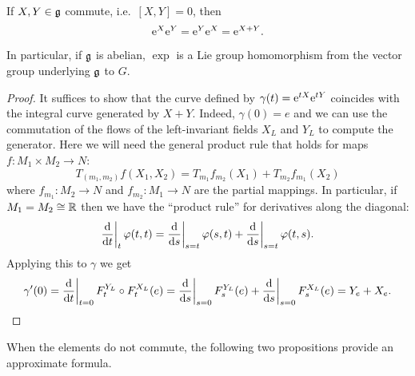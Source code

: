 \begin{prop}
    If $X,Y\in\mathfrak{g}$ commute, i.e.~$[X,Y]=0$, then
    \[\mathrm{e}^X\mathrm{e}^Y=\mathrm{e}^Y\mathrm{e}^X=\mathrm{e}^{X+Y}.\]
    In particular, if $\mathfrak{g}$ is abelian, $\exp$ is a Lie group homomorphism from the vector group underlying $\mathfrak{g}$ to $G$.
\end{prop}
\begin{proof}
    It suffices to show that the curve defined by $\gamma(t)=\mathrm{e}^{tX}\mathrm{e}^{tY}$ coincides with the integral curve generated by $X+Y$. Indeed, $\gamma(0)=e$ and we can use the commutation of the flows of the left-invariant fields $X_L$ and $Y_L$ to compute the generator. Here we will need the general product rule that holds for maps $f:M_1\times M_2\to N$:
    \[T_{(m_1,m_2)}f(X_1,X_2)=T_{m_1}f_{m_2}(X_1)+T_{m_2}f_{m_1}(X_2)\]
    where $f_{m_1}:M_2\to N$ and $f_{m_2}:M_1\to N$ are the partial mappings. In particular, if $M_1=M_2\cong \mathbb{R}$ then we have the ``product rule'' for derivatives along the diagonal:
    \[\restr{\frac{\dd}{\dd t}}{t}\varphi(t,t)=\restr{\frac{\dd}{\dd s}}{s=t}\varphi(s,t)+\restr{\frac{\dd}{\dd s}}{s=t}\varphi(t,s).\]
    Applying this to $\gamma$ we get 
    \begin{multline}
        \gamma'(0)=\restr{\frac{\dd}{\dd t}}{t=0} F^{Y_L}_t\circ F^{X_L}_t (e)=\restr{\frac{\dd}{\dd s}}{s=0}F^{Y_L}_{s}(e)+\restr{\frac{\dd}{\dd s}}{s=0}F^{X_L}_{s}(e)=Y_e+X_e.
    \end{multline}
\end{proof}

When the elements do not commute, the following two propositions provide an approximate formula.

